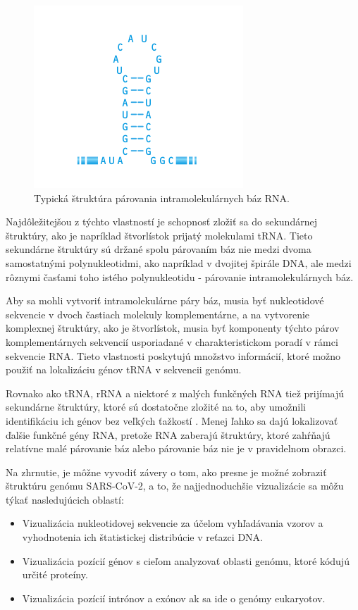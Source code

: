 \begin{figure}[!ht]
	\centering
	\includegraphics[width=.5\textwidth]{figures/rna.png}
	\caption{Typická štruktúra párovania intramolekulárnych báz RNA.\label{o:latex_friendly_zone}}
\end{figure}

Najdôležitejšou z týchto vlastností je schopnosť zložiť sa do sekundárnej štruktúry, ako je napríklad štvorlístok prijatý molekulami tRNA.
Tieto sekundárne štruktúry sú držané spolu párovaním báz nie medzi dvoma samostatnými polynukleotidmi, ako napríklad v dvojitej špirále DNA,
ale medzi rôznymi časťami toho istého polynukleotidu - párovanie intramolekulárnych báz.

Aby sa mohli vytvoriť intramolekulárne páry báz, musia byť nukleotidové sekvencie v dvoch častiach molekuly komplementárne,
a na vytvorenie komplexnej štruktúry, ako je štvorlístok, musia byť komponenty týchto párov komplementárnych sekvencií usporiadané v charakteristickom poradí v rámci sekvencie RNA.
Tieto vlastnosti poskytujú množstvo informácií, ktoré možno použiť na lokalizáciu génov tRNA v sekvencii genómu. 

Rovnako ako tRNA, rRNA a niektoré z malých funkčných RNA tiež prijímajú sekundárne štruktúry, ktoré sú dostatočne zložité na to, aby umožnili identifikáciu ich génov bez veľkých ťažkostí \cite{rna}.
Menej ľahko sa dajú lokalizovať ďalšie funkčné gény RNA, pretože RNA zaberajú štruktúry, ktoré zahŕňajú relatívne malé párovanie báz alebo párovanie báz nie je v pravidelnom obrazci.

\bigskip
\smallskip

Na zhrnutie, je môžne vyvodiť závery o tom, ako presne je možné zobraziť štruktúru genómu SARS-CoV-2, a to, že najjednoduchšie vizualizácie sa môžu týkať nasledujúcich oblastí:
\begin{itemize}
	\item Vizualizácia nukleotidovej sekvencie za účelom vyhľadávania vzorov a vyhodnotenia ich štatistickej distribúcie v reťazci DNA.
	\item Vizualizácia pozícií génov s cieľom analyzovať oblasti genómu, ktoré kódujú určité proteíny.
	\item Vizualizácia pozícií intrónov a exónov ak sa ide o genómy eukaryotov.
\end{itemize} 

